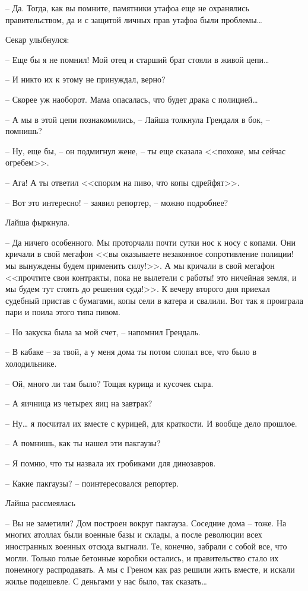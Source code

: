 -- Да. Тогда, как вы помните, памятники утафоа еще не охранялись правительством, да и с защитой личных прав утафоа были проблемы\ldots{}

Секар улыбнулся:

-- Еще бы я не помнил! Мой отец и старший брат стояли в живой цепи\ldots{}

-- И никто их к этому не принуждал, верно?

-- Скорее уж наоборот. Мама опасалась, что будет драка с полицией\ldots{}

-- А мы в этой цепи познакомились, -- Лайша толкнула Грендаля в бок, -- помнишь?

-- Ну, еще бы, -- он подмигнул жене, -- ты еще сказала <<похоже, мы сейчас огребем>>.

-- Ага! А ты ответил <<спорим на пиво, что копы сдрейфят>>.

-- Вот это интересно! -- заявил репортер, -- можно подробнее?

Лайша фыркнула.

-- Да ничего особенного. Мы проторчали почти сутки нос к носу с копами. Они кричали в свой мегафон <<вы оказываете незаконное сопротивление полиции! мы вынуждены будем применить силу!>>. А мы кричали в свой мегафон <<прочтите свои контракты, пока не вылетели с работы! это ничейная земля, и мы будем тут стоять до решения суда!>>. К вечеру второго дня приехал судебный пристав с бумагами, копы сели в катера и свалили. Вот так я проиграла пари и поила этого типа пивом.

-- Но закуска была за мой счет, -- напомнил Грендаль.

-- В кабаке -- за твой, а у меня дома ты потом слопал все, что было в холодильнике.

-- Ой, много ли там было? Тощая курица и кусочек сыра.

-- А яичница из четырех яиц на завтрак?

-- Ну\ldots{} я посчитал их вместе с курицей, для краткости. И вообще дело прошлое.

-- А помнишь, как ты нашел эти пакгаузы?

-- Я помню, что ты назвала их гробиками для динозавров.

-- Какие пакгаузы? -- поинтересовался репортер.

Лайша рассмеялась

-- Вы не заметили? Дом построен вокруг пакгауза. Соседние дома -- тоже. На многих атоллах были военные базы и склады, а после революции всех иностранных военных отсюда выгнали. Те, конечно, забрали с собой все, что могли. Только голые бетонные коробки остались, и правительство стало их понемногу распродавать. А мы с Греном как раз решили жить вместе, и искали жилье подешевле. С деньгами у нас было, так сказать\ldots{}

